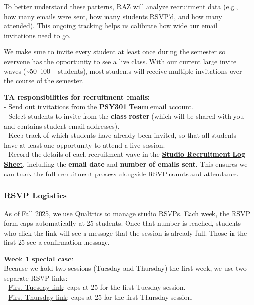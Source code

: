 \documentclass[
]{article}
\begin{document}
To better understand these patterns, RAZ will analyze recruitment data (e.g., how many emails were sent, how many students RSVP'd, and how many attended). This ongoing tracking helps us calibrate how wide our email invitations need to go.

We make sure to invite every student at least once during the semester so everyone has the opportunity to see a live class. With our current large invite waves (\textasciitilde50--100+ students), most students will receive multiple invitations over the course of the semester.

\textbf{TA responsibilities for recruitment emails:}\\
- Send out invitations from the \textbf{PSY301 Team} email account.\\
- Select students to invite from the \textbf{class roster} (which will be shared with you and contains student email addresses).\\
- Keep track of which students have already been invited, so that all students have at least one opportunity to attend a live session.\\
- Record the details of each recruitment wave in the \href{https://docs.google.com/spreadsheets/d/1c99r7PZXdpGsK9qJI7nqpL0r9CE9qULdytwzmRFdW9o/edit?usp=sharing}{\textbf{Studio Recruitment Log Sheet}}, including the \textbf{email date} and \textbf{number of emails sent}. This ensures we can track the full recruitment process alongside RSVP counts and attendance.

\hypertarget{rsvp-logistics}{%
\subsubsection{RSVP Logistics}\label{rsvp-logistics}}

As of Fall 2025, we use Qualtrics to manage studio RSVPs. Each week, the RSVP form caps automatically at 25 students. Once that number is reached, students who click the link will see a message that the session is already full. Those in the first 25 see a confirmation message.

\textbf{Week 1 special case:}\\
Because we hold two sessions (Tuesday and Thursday) the first week, we use two separate RSVP links:\\
- \href{https://utexas.qualtrics.com/jfe/form/SV_1RDMx9U8zFq3oFg?SessionDate=first_tuesday}{First Tuesday link}: caps at 25 for the first Tuesday session.\\
- \href{https://utexas.qualtrics.com/jfe/form/SV_1RDMx9U8zFq3oFg?SessionDate=first_thursday}{First Thursday link}: caps at 25 for the first Thursday session.
\end{document}
